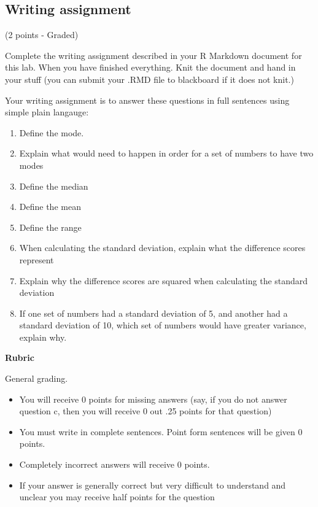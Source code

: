 \documentclass[]{book}
\providecommand{\tightlist}{%
  \setlength{\itemsep}{0pt}\setlength{\parskip}{0pt}}
\begin{document}
\subsection{Writing assignment}\label{writing-assignment-1}

(2 points - Graded)

Complete the writing assignment described in your R Markdown document
for this lab. When you have finished everything. Knit the document and
hand in your stuff (you can submit your .RMD file to blackboard if it
does not knit.)

Your writing assignment is to answer these questions in full sentences
using simple plain langauge:

\begin{enumerate}
\def\labelenumi{\arabic{enumi}.}
\tightlist
\item
  Define the mode.
\item
  Explain what would need to happen in order for a set of numbers to
  have two modes
\item
  Define the median
\item
  Define the mean
\item
  Define the range
\item
  When calculating the standard deviation, explain what the difference
  scores represent
\item
  Explain why the difference scores are squared when calculating the
  standard deviation
\item
  If one set of numbers had a standard deviation of 5, and another had a
  standard deviation of 10, which set of numbers would have greater
  variance, explain why.
\end{enumerate}

\textbf{Rubric}

General grading.

\begin{itemize}
\tightlist
\item
  You will receive 0 points for missing answers (say, if you do not
  answer question c, then you will receive 0 out .25 points for that
  question)
\item
  You must write in complete sentences. Point form sentences will be
  given 0 points.
\item
  Completely incorrect answers will receive 0 points.
\item
  If your answer is generally correct but very difficult to understand
  and unclear you may receive half points for the question
\end{itemize}
\end{document}
